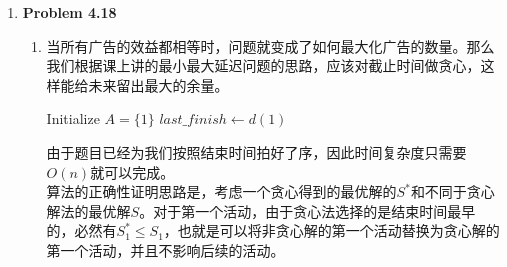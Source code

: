 \documentclass{ctexart}
\begin{document}
\begin{enumerate}[label=\arabic*.]
        算法的正确性证明如下：\\
        假设贪心法求得的调度不是最优的，即存在一个最优调度方案 $S$，它的总罚款严格小于贪心方案。在最优方案 $S$ 中，必然存在这样一种情况：
        有一项罚款很高的作业 $B$ 被安排在了截止时间 $D$ 之后（即被延误，支付了罚金 $m(B)$），而同时有一项罚款较低的作业 $A$ 被安排在了截止时间 $D$ 之前（即按时完成，免除了罚金 $m(A)$），且满足 $m(B) > m(A)$。(如果不存这种情况，说明所有罚金最高的 $D$ 个任务都在 $D$ 之前完成了，这就和贪心解完全等价了)。
        我们可以将方案 $S$ 中作业 $A$ 和作业 $B$ 的加工时间对调。交换后，作业 $B$ 变成了按时完成，免除了 $m(B)$ 的罚金。作业 $A$ 变成了被延误，需要支付 $m(A)$ 的罚金。其他所有作业的位置和完成状态均未改变。我们来计算交换前后总罚款的变化量 $\Delta := \text{新方案罚款} - \text{原方案罚款} = m(A) - m(B)$。
        因为已知 $m(B) > m(A)$，所以 $\Delta < 0$。这意味着，通过交换 $A$ 和 $B$，我们得到了一个总罚款更少的新调度方案。这与 $S$ 是最优解的假设矛盾。因此，最优调度方案中，安排在 $D$ 之前的作业必然是罚款金额最大的前 $D$ 个作业。
        贪心算法总是能给出最优解，算法正确。
    \item \textbf{Problem 4.18}
        \begin{enumerate}[label=(\arabic*)]
            \item 当所有广告的效益都相等时，问题就变成了如何最大化广告的数量。那么我们根据课上讲的最小最大延迟问题的思路，应该对截止时间做贪心，这样能给未来留出最大的余量。\\
                \begin{algorithm}[H]
                    \caption{广告活动选择问题（贪心法）}
                    Initialize $A = \{1\}$ 
                    $last\_finish \leftarrow d(1)$\;
                    \;
                \end{algorithm}
                由于题目已经为我们按照结束时间拍好了序，因此时间复杂度只需要$O(n)$就可以完成。\\
                算法的正确性证明思路是，考虑一个贪心得到的最优解的$S^*$和不同于贪心解法的最优解$S$。对于第一个活动，由于贪心法选择的是结束时间最早的，必然有$S^*_1\le S_1$，也就是可以将非贪心解的第一个活动替换为贪心解的第一个活动，并且不影响后续的活动。

\end{enumerate}
\end{enumerate}
\end{document}
